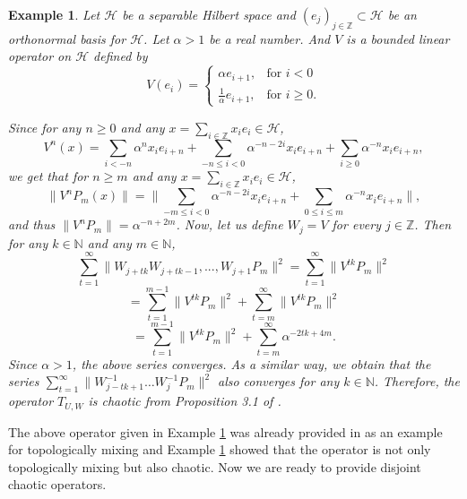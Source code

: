 \documentclass{article}
\newtheorem {example}[theorem]{Example}
\begin{document}
\begin{example}\label{ex3.1}\textnormal{
Let $\mathcal{H}$ be a separable Hilbert space and $(e_{j})_{j\in\mathbb{Z}}\subset\mathcal{H}$ be an orthonormal basis for $\mathcal{H}$. Let $\alpha>1$ be a real number. And $V$ is a bounded linear operator on $\mathcal{H}$ defined by}
\begin{displaymath}
V(e_{i})=\left\{ \begin{array}{ll}
\alpha e_{i+1}, & \textrm{for } i<0\\
\frac{1}{\alpha}e_{i+1}, & \textrm{for } i\geq 0.
\end{array} \right.
\end{displaymath}

\textnormal{
Since for any $n\geq 0$ and any $x=\sum_{i\in\mathbb{Z}}x_{i}e_{i}\in \mathcal{H}$,
\[V^{n}(x)=\sum_{i<-n}\alpha^{n}x_{i}e_{i+n}+\sum_{-n\leq i< 0}\alpha^{-n-2i}x_{i}e_{i+n}+\sum_{i\geq 0}\alpha^{-n}x_{i}e_{i+n},\]
we get that for $n\geq m$ and any $x=\sum_{i\in\mathbb{Z}}x_{i}e_{i}\in \mathcal{H}$,
\[\|V^{n}P_{m}(x)\|=\|\sum_{-m\leq i< 0}\alpha^{-n-2i}x_{i}e_{i+n}+\sum_{0\leq i\leq m}\alpha^{-n}x_{i}e_{i+n}\|,\]  and thus $\|V^{n}P_{m}\|=\alpha^{-n+2m}$.
Now, let us define $W_{j}=V$ for every $j\in \mathbb{Z}$. Then for any $k\in \mathbb{N}$ and any $m\in\mathbb{N}$, 
\[\sum^{\infty}_{t=1}\|W_{j+tk}W_{j+tk-1},...,W_{j+1}P_{m}\|^{2}= \sum^{\infty}_{t=1}\|V^{tk}P_{m}\|^{2}\]
\[=\sum^{m-1}_{t=1}\|V^{tk}P_{m}\|^{2}+\sum^{\infty}_{t=m}\|V^{tk}P_{m}\|^{2}\]
\[=\sum^{m-1}_{t=1}\|V^{tk}P_{m}\|^{2}+\sum^{\infty}_{t=m}\alpha^{-2tk+4m}.\]
Since $\alpha>1$, the above series converges.
As a similar way, we obtain that the series
$\sum^{\infty}_{t=1}\|W^{-1}_{j-tk+1}\ldots W^{-1}_{j}P_{m}\|^{2}$ also converges for any $k\in \mathbb{N}$. 
Therefore, the operator $T_{U,W}$ is chaotic from Proposition 3.1 of \cite{RJ26}.}
\end{example}

The above operator given in Example \ref{ex3.1} was already provided in \cite{RJ26} as an example for topologically mixing and Example \ref{ex3.1} showed that the operator is not only topologically mixing but also chaotic. 
Now we are ready to provide disjoint chaotic operators.
\end{document}
